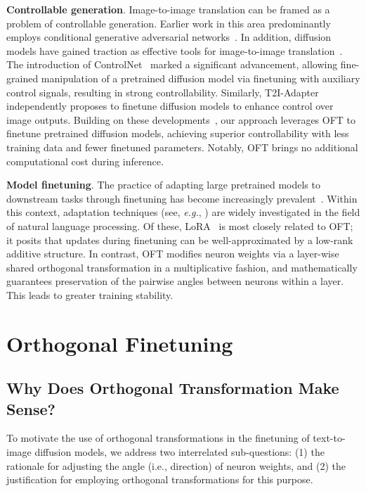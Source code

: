 \textbf{Controllable generation}. Image-to-image translation can be framed as a problem of controllable generation. Earlier work in this area predominantly employs conditional generative adversarial networks~\cite{isola2017image,zhu2017toward,wang2018high,park2019semantic,choi2018stargan}. In addition, diffusion models have gained traction as effective tools for image-to-image translation~\cite{saharia2022palette,voynov2022sketch,wang2022pretraining}. The introduction of ControlNet~\cite{zhang2023adding} marked a significant advancement, allowing fine-grained manipulation of a pretrained diffusion model via finetuning with auxiliary control signals, resulting in strong controllability. Similarly, T2I-Adapter~\cite{mou2023t2i} independently proposes to finetune diffusion models to enhance control over image outputs. Building on these developments~\cite{zhang2023adding,mou2023t2i}, our approach leverages OFT to finetune pretrained diffusion models, achieving superior controllability with less training data and fewer finetuned parameters. Notably, OFT brings no additional computational cost during inference.

\textbf{Model finetuning}. The practice of adapting large pretrained models to downstream tasks through finetuning has become increasingly prevalent~\cite{devlin2018bert,brown2020language,he2022masked}. Within this context, adaptation techniques (see, \emph{e.g.}, \cite{hulora2022,houlsby2019parameter,pfeiffer2020adapterfusion}) are widely investigated in the field of natural language processing. Of these, LoRA~\cite{hulora2022} is most closely related to OFT; it posits that updates during finetuning can be well-approximated by a low-rank additive structure. In contrast, OFT modifies neuron weights via a layer-wise shared orthogonal transformation in a multiplicative fashion, and mathematically guarantees preservation of the pairwise angles between neurons within a layer. This leads to greater training stability.

\section{Orthogonal Finetuning}

\subsection{Why Does Orthogonal Transformation Make Sense?}

To motivate the use of orthogonal transformations in the finetuning of text-to-image diffusion models, we address two interrelated sub-questions: (1) the rationale for adjusting the angle (i.e., direction) of neuron weights, and (2) the justification for employing orthogonal transformations for this purpose.

